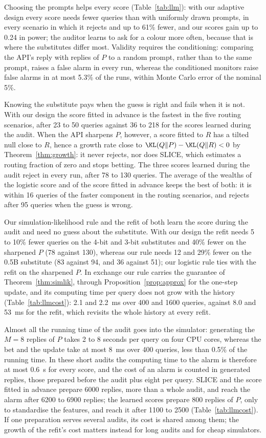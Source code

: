 Choosing the prompts helps every score (Table~\ref{tab:llm}): with our
adaptive design every score needs fewer queries than with uniformly drawn
prompts, in every scenario in which it rejects and up to 61\% fewer, and our
scores gain up to 0.24 in power; the auditor learns to ask for a colour more
often, because that is where the substitutes differ most. Validity requires
the conditioning: comparing the API's reply with replies of $P$ to a random
prompt, rather than to the same prompt, raises a false alarm in every run,
whereas the conditioned monitors raise false alarms in at most 5.3\% of the
runs, within Monte Carlo error of the nominal 5\%.

Knowing the substitute pays when the guess is right and fails when it is not.
With our design the score fitted in advance is the fastest in the five
routing scenarios, after 23 to 50 queries against 36 to 218 for the scores
learned during the audit. When the API sharpens $P$, however, a score fitted
to $R$ has a tilted null close to $R$, hence a growth rate close to
$\KL(Q\|P) - \KL(Q\|R) < 0$ by Theorem~\ref{thm:growth}: it never rejects,
nor does SLICE, which estimates a routing fraction of zero and stops betting.
The three scores learned during the audit reject in every run, after 78 to
130 queries. The average of the wealths of the logistic score and of the
score fitted in advance keeps the best of both: it is within 16 queries of
the faster component in the routing scenarios, and rejects after 95 queries
when the guess is wrong.

Our simulation-likelihood rule and the refit of \citet{forre2026anytime} both
learn the score during the audit and need no guess about the substitute. With
our design the refit needs 5 to 10\% fewer queries on the 4-bit and 3-bit
substitutes and 40\% fewer on the sharpened $P$ (78 against 130), whereas our
rule needs 12 and 29\% fewer on the 0.5B substitute (83 against 94, and 36
against 51); our logistic rule ties with the refit on the sharpened $P$. In
exchange our rule carries the guarantee of Theorem~\ref{thm:simlik}, through
Proposition~\ref{prop:approx} for the one-step update, and its computing time
per query does not grow with the history (Table~\ref{tab:llmcost}): 2.1 and
2.2~ms over 400 and 1600 queries, against 8.0 and 53~ms for the refit, which
revisits the whole history at every refit.

Almost all the running time of the audit goes into the simulator: generating
the $M = 8$ replies of $P$ takes 2 to 8 seconds per query on four CPU cores,
whereas the bet and the update take at most 8~ms over 400 queries, less than
0.5\% of the running time. In these short audits the computing time to the
alarm is therefore at most 0.6~s for every score, and the cost of an alarm is
counted in generated replies, those prepared before the audit plus eight per
query. SLICE and the score fitted in advance prepare 6000 replies, more than
a whole audit, and reach the alarm after 6200 to 6900 replies; the learned
scores prepare 800 replies of $P$, only to standardise the features, and
reach it after 1100 to 2500 (Table~\ref{tab:llmcost}). If one preparation
serves several audits, its cost is shared among them; the growth of the
refit's cost matters instead for long audits and for cheap simulators.


